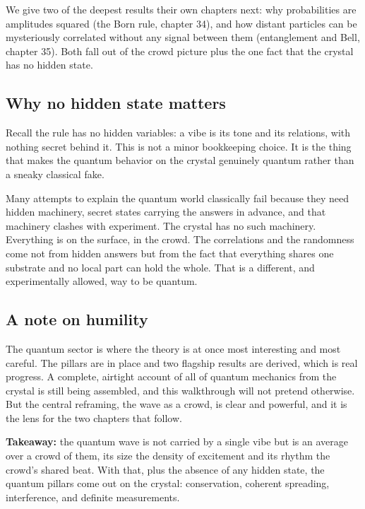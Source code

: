 We give two of the deepest results their own chapters next: why probabilities are amplitudes squared (the Born rule, chapter 34), and how distant particles can be mysteriously correlated without any signal between them (entanglement and Bell, chapter 35). Both fall out of the crowd picture plus the one fact that the crystal has no hidden state.

\subsection{Why no hidden state matters}

Recall the rule has no hidden variables: a vibe is its tone and its relations, with nothing secret behind it. This is not a minor bookkeeping choice. It is the thing that makes the quantum behavior on the crystal genuinely quantum rather than a sneaky classical fake.

Many attempts to explain the quantum world classically fail because they need hidden machinery, secret states carrying the answers in advance, and that machinery clashes with experiment. The crystal has no such machinery. Everything is on the surface, in the crowd. The correlations and the randomness come not from hidden answers but from the fact that everything shares one substrate and no local part can hold the whole. That is a different, and experimentally allowed, way to be quantum.

\subsection{A note on humility}

The quantum sector is where the theory is at once most interesting and most careful. The pillars are in place and two flagship results are derived, which is real progress. A complete, airtight account of all of quantum mechanics from the crystal is still being assembled, and this walkthrough will not pretend otherwise. But the central reframing, the wave as a crowd, is clear and powerful, and it is the lens for the two chapters that follow.

\textbf{Takeaway:} the quantum wave is not carried by a single vibe but is an average over a crowd of them, its size the density of excitement and its rhythm the crowd's shared beat. With that, plus the absence of any hidden state, the quantum pillars come out on the crystal: conservation, coherent spreading, interference, and definite measurements.
